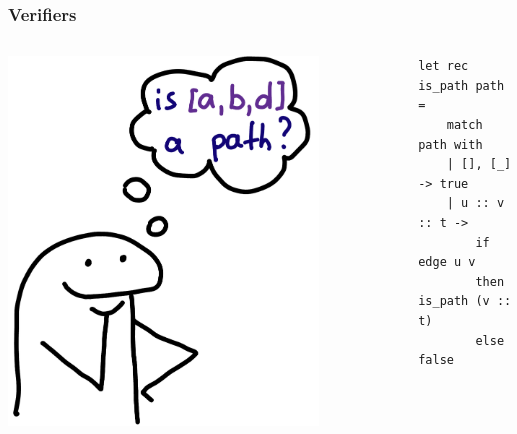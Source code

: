 \documentclass[xcolor={dvipsnames}, aspectratio=169]{beamer}
\begin{document}
\begin{frame}[fragile]
  \frametitle{Verifiers}
  \begin{columns}    
    \begin{column}{0.35\textwidth}
      \centering
      \includegraphics[width=0.8\textwidth]{pic/verifier.jpg}
    \end{column}
    \begin{column}{0.75\textwidth} 
      \begin{center}
        \begin{minipage}{0.82\textwidth}
      \begin{lstlisting}[language=ocanren]
  let rec is_path path =
    match path with 
    | [], [_] -> true 
    | u :: v :: t -> 
        if edge u v 
        then is_path (v :: t)
        else false 
      \end{lstlisting}
    \end{minipage}
  \end{center}      
    \end{column}
  \end{columns}
\end{frame}
\end{document}
